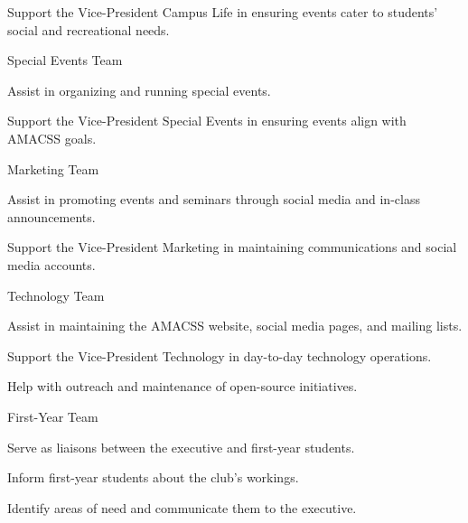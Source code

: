 \documentclass[12pt,a4paper]{article}
\begin{document}
\begin{constitutionlist}
\begin{constitutionlist}
\begin{constitutionlist}
\item Support the Vice-President Campus Life in ensuring events cater to students' social and recreational needs.
\end{constitutionlist}

\item Special Events Team

\begin{constitutionlist}
\item Assist in organizing and running special events.

\item Support the Vice-President Special Events in ensuring events align with AMACSS goals.
\end{constitutionlist}

\item Marketing Team

\begin{constitutionlist}
\item Assist in promoting events and seminars through social media and in-class announcements.

\item Support the Vice-President Marketing in maintaining communications and social media accounts.
\end{constitutionlist}

\item Technology Team

\begin{constitutionlist}
\item Assist in maintaining the AMACSS website, social media pages, and mailing lists.

\item Support the Vice-President Technology in day-to-day technology operations.

\item Help with outreach and maintenance of open-source initiatives.
\end{constitutionlist}

\item First-Year Team

\begin{constitutionlist}
\item Serve as liaisons between the executive and first-year students.

\item Inform first-year students about the club's workings.

\item Identify areas of need and communicate them to the executive.
\end{constitutionlist}


\end{constitutionlist}
\end{constitutionlist}
\end{document}
